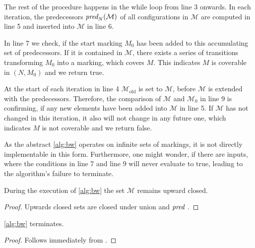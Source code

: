The rest of the procedure happens in the while loop from line 3 onwards. In each iteration, the predecessors $\operatorname{\textit{pred}}_{N}(\mathcal{M})$ of all configurations in $\mathcal{M}$ are computed in line 5 and inserted into $\mathcal{M}$ in line 6. 
\par
In line 7 we check, if the start marking $M_{0}$ has been added to this accumulating set of predecessors. If it is contained in $\mathcal{M}$, there exists a series of transitions transforming $M_{0}$ into a marking, which covers $M$. This indicates $M$ is coverable in $(N,M_{0})$ and we return true. 
\par
At the start of each iteration in line 4 $\mathcal{M}_{\text{old}}$ is set to $\mathcal{M}$, before $\mathcal{M}$ is extended with the predecessors. Therefore, the comparison of $\mathcal{M}$ and $\mathcal{M}_{0}$ in line 9 is confirming, if any new elements have been added into $\mathcal{M}$ in line 5. If $\mathcal{M}$ has not changed in this iteration, it also will not change in any future one, which indicates $M$ is not coverable and we return false.
\par




As the abstract \autoref{alg:bw} operates on infinite sets of markings, it is not directly implementable in this form. Furthermore, one might wonder, if there are inputs, where the conditions in line 7 and line 9 will never evaluate to true, leading to the algorithm's failure to terminate.

\begin{lemma}\label{lem:upwclosed}
During the execution of \autoref{alg:bw} the set $\mathcal{M}$ remains upward closed. 
\end{lemma}
\begin{proof}
Upwards closed sets are closed under union and $\operatorname{\textit{pred}}$ {\cite[Lemma~3.2.16]{esparza_19}}. 
\end{proof}


\begin{lemma}\label{lem:bwterm}
\autoref{alg:bw} terminates. 
\end{lemma}
\begin{proof}
Follows immediately from {\cite[Lemma~3.2.17]{esparza_19}}.
\end{proof}

